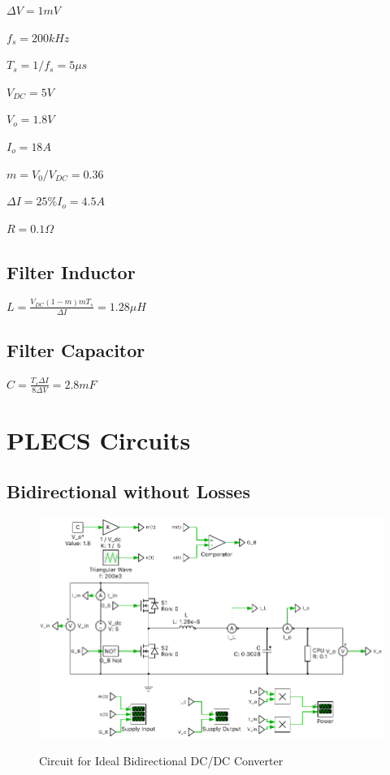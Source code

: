 \documentclass{article}
\begin{document}
$\Delta{}V = 1 mV$

$f_s = 200 kHz$

$T_s = 1 / f_s = 5 \mu{s}$

$V_{DC} = 5 V$

$V_o = 1.8 V$

$I_o = 18 A$

$m = V_0 / V_{DC} = 0.36$

$\Delta{I} = 25\% I_o = 4.5 A$

$R = 0.1 \Omega$

\subsection{Filter Inductor}

$L = \frac{V_{DC} (1 - m) m T_s}{\Delta{I}} = 1.28 \mu{H}$

\subsection{Filter Capacitor}

$C = \frac{T_s \Delta{I}}{8 \Delta{V}} = 2.8 m{F}$

\section{PLECS Circuits}

\subsection{Bidirectional without Losses}

\begin{figure}[H]
    \centering{}
    \includegraphics[width=\textwidth]{img/ideal-bidirectional.pdf}
    \label{fig:ideal-bi-circuit}
    \caption{Circuit for Ideal Bidirectional DC/DC Converter}
\end{figure}
\end{document}
